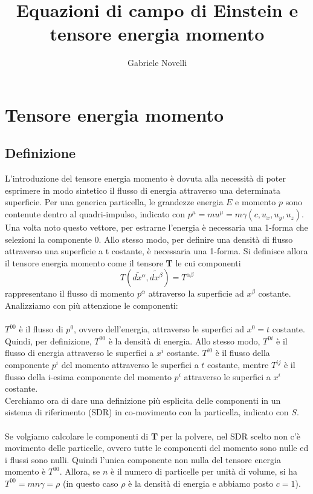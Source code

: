 \documentclass[]{report}
\title{Equazioni di campo di Einstein e tensore energia momento}
\author{Gabriele Novelli}
\theoremstyle{definition}
\theoremstyle{Theorem}
\theoremstyle{definition}
\theoremstyle{definition}
\theoremstyle{definition}
\begin{document}
\maketitle

\begin{abstract}

\end{abstract}

\section{Tensore energia momento}
\subsection{Definizione}
L'introduzione del tensore energia momento è dovuta alla necessità di poter esprimere in modo sintetico il flusso di energia attraverso una determinata superficie.
Per una generica particella, le grandezze energia $E$ e momento $p$ sono contenute dentro al quadri-impulso, indicato con $p^\mu=mu^\mu=m\gamma(c,u_x,u_y,u_z)$. Una volta noto questo vettore, per estrarne l'energia è necessaria una 1-forma che selezioni la componente 0. Allo stesso modo, per definire una densità di flusso attraverso una superficie a t costante, è necessaria una 1-forma. Si definisce allora il tensore energia momento come il tensore \textbf{T} le cui componenti
$$T(\tilde{dx^\alpha},\tilde{dx^\beta})=T^{\alpha\beta}$$
rappresentano il flusso di momento $p^\alpha$ attraverso la superficie ad $x^\beta$ costante.\\
Analizziamo con più attenzione le componenti:\\
\\
$T^{00}$ è il flusso di $p^0$, ovvero dell'energia, attraverso le superfici ad $x^0=t$ costante. Quindi, per definizione, $T^{00}$ è la densità di energia.
Allo stesso modo, $T^{0i}$ è il flusso di energia attraverso le superfici a $x^i$ costante.
$T^{i0}$ è il flusso della componente $p^i$ del momento attraverso le superfici a $t$ costante, mentre $T^{ij}$ è il flusso della i-esima componente del momento $p^i$ attraverso le superfici a $x^i$ costante.
\\
Cerchiamo ora di dare una definizione più esplicita delle componenti in un sistema di riferimento (SDR) in co-movimento con la particella, indicato con $S$.\\
\\
Se volgiamo calcolare le componenti di \textbf{T} per la polvere, nel SDR scelto non c'è movimento delle particelle, ovvero tutte le componenti del momento sono nulle ed i flussi sono nulli. Quindi l'unica componente non nulla del tensore energia momento è $T^{00}$. Allora, se $n$ è il numero di particelle per unità di volume, si ha $T^{00}=mn\gamma=\rho$ (in questo caso $\rho$ è la densità di energia e abbiamo posto $c=1$). \\
\end{document}
